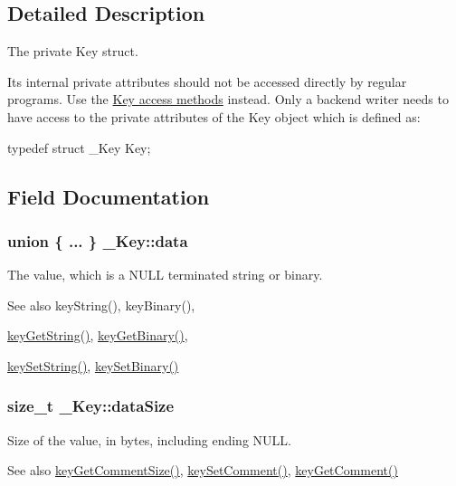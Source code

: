 \subsection{Detailed Description}
The private Key struct.

Its internal private attributes should not be accessed directly by regular programs. Use the \hyperlink{group__key}{Key access methods} instead. Only a backend writer needs to have access to the private attributes of the Key object which is defined as: 
\begin{DoxyCode}
typedef struct _Key Key;
\end{DoxyCode}
 

\subsection{Field Documentation}
\hypertarget{struct__Key_adc2c86e77553ed8224c9516487299459}{
\subsubsection[{data}]{\setlength{\rightskip}{0pt plus 5cm}union \{ ... \}   {\bf \_\-Key::data}}}
\label{struct__Key_adc2c86e77553ed8224c9516487299459}
The value, which is a NULL terminated string or binary. \begin{DoxySeeAlso}{See also}
keyString(), keyBinary(), 

\hyperlink{group__keyvalue_ga41b9fac5ccddafe407fc0ae1e2eb8778}{keyGetString()}, \hyperlink{group__keyvalue_ga4c0d8a4a11174197699c231e0b5c3c84}{keyGetBinary()}, 

\hyperlink{group__keyvalue_ga622bde1eb0e0c4994728331326340ef2}{keySetString()}, \hyperlink{group__keyvalue_gaa50a5358fd328d373a45f395fa1b99e7}{keySetBinary()} 
\end{DoxySeeAlso}
\hypertarget{struct__Key_a4fd6239c6f82dd78181d6b497ff30f7e}{
\subsubsection[{dataSize}]{\setlength{\rightskip}{0pt plus 5cm}size\_\-t {\bf \_\-Key::dataSize}}}
\label{struct__Key_a4fd6239c6f82dd78181d6b497ff30f7e}
Size of the value, in bytes, including ending NULL. \begin{DoxySeeAlso}{See also}
\hyperlink{group__keyvalue_ga0dd737fadc16d4cf16720d17f066a9d3}{keyGetCommentSize()}, \hyperlink{group__keyvalue_ga8863a877a84fa46e6017fe72e49b89c1}{keySetComment()}, \hyperlink{group__keyvalue_gafb89735689929ff717cc9f2d0d0b46a2}{keyGetComment()} 
\end{DoxySeeAlso}
